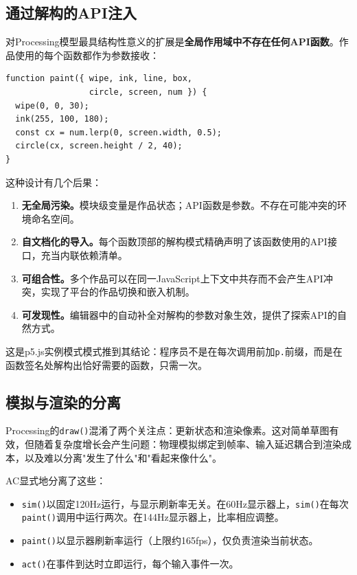 \documentclass[10pt,letterpaper,twocolumn]{article}
\begin{document}
\subsection{通过解构的API注入}

对Processing模型最具结构性意义的扩展是\textbf{全局作用域中不存在任何API函数}。作品使用的每个函数都作为参数接收：

\begin{lstlisting}[style=acjsstyle,caption={AC中的API解构。}]
function paint({ wipe, ink, line, box,
                 circle, screen, num }) {
  wipe(0, 0, 30);
  ink(255, 100, 180);
  const cx = num.lerp(0, screen.width, 0.5);
  circle(cx, screen.height / 2, 40);
}
\end{lstlisting}

这种设计有几个后果：

\begin{enumerate}
  \item \textbf{无全局污染。}模块级变量是作品状态；API函数是参数。不存在可能冲突的环境命名空间。
  \item \textbf{自文档化的导入。}每个函数顶部的解构模式精确声明了该函数使用的API接口，充当内联依赖清单。
  \item \textbf{可组合性。}多个作品可以在同一JavaScript上下文中共存而不会产生API冲突，实现了平台的作品切换和嵌入机制。
  \item \textbf{可发现性。}编辑器中的自动补全对解构的参数对象生效，提供了探索API的自然方式。
\end{enumerate}

这是p5.js实例模式模式推到其结论：程序员不是在每次调用前加\texttt{p.}前缀，而是在函数签名处解构出恰好需要的函数，只需一次。

\subsection{模拟与渲染的分离}
\label{sec:simsep}

Processing的\texttt{draw()}混淆了两个关注点：更新状态和渲染像素。这对简单草图有效，但随着复杂度增长会产生问题：物理模拟绑定到帧率、输入延迟耦合到渲染成本，以及难以分离"发生了什么"和"看起来像什么"。

AC显式地分离了这些：

\begin{itemize}
  \item \texttt{sim()}以固定120Hz运行，与显示刷新率无关。在60Hz显示器上，\texttt{sim()}在每次\texttt{paint()}调用中运行两次。在144Hz显示器上，比率相应调整。
  \item \texttt{paint()}以显示器刷新率运行（上限约165fps），仅负责渲染当前状态。
  \item \texttt{act()}在事件到达时立即运行，每个输入事件一次。
\end{itemize}
\end{document}
